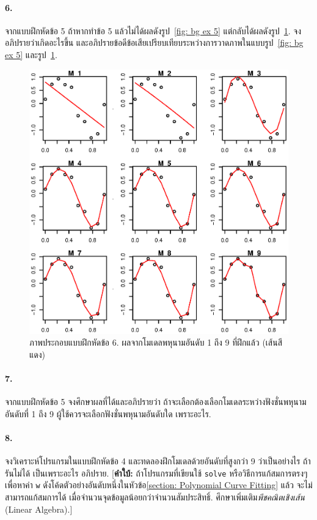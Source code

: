 \paragraph{6.} จากแบบฝึกหัดข้อ 5 
ถ้าหากทำข้อ 5 แล้วไม่ได้ผลดังรูป~\ref{fig: bg ex 5} 
แต่กลับได้ผลดังรูป~\ref{fig: bg ex 6}. 
จงอภิปรายว่าเกิดอะไรขึ้น และอภิปรายข้อดีข้อเสียเปรียบเทียบระหว่างการวาดภาพในแบบรูป~\ref{fig: bg ex 5} และรูป~\ref{fig: bg ex 6}.

%
\begin{figure}
\begin{center}
\includegraphics[width=5.5in]{02Background/bgEx06.eps}
\end{center}
\caption{ภาพประกอบแบบฝึกหัดข้อ 6.
ผลจากโมเดลพหุนามอันดับ 1 ถึง 9 ที่ฝึกแล้ว (เส้นสีแดง)}
\label{fig: bg ex 6}
\end{figure}
%

\paragraph{7.} จากแบบฝึกหัดข้อ 5
จงศึกษาผลที่ได้และอภิปรายว่า
ถ้าจะเลือกต้องเลือกโมเดลระหว่างฟังชั่นพหุนามอันดับที่ 1 ถึง 9 
ผู้ใช้ควรจะเลือกฟังชั่นพหุนามอันดับใด เพราะอะไร.

\paragraph{8.} จงวิเคราะห์โปรแกรมในแบบฝึกหัดข้อ 4 และทดลองฝึกโมเดลด้วยอันดับที่สูงกว่า 9 ว่าเป็นอย่างไร ถ้ารันไม่ได้ เป็นเพราะอะไร อภิปราย.
[\textbf{คำใบ้:} ถ้าโปรแกรมที่เขียนใช้ \texttt{solve} หรือวิธีการแก้สมการตรงๆ เพื่อหาค่า \texttt{w} ดังโค้ดตัวอย่างอันดับหนึ่งในหัวข้อ\ref{section: Polynomial Curve Fitting} แล้ว จะไม่สามารถแก้สมการได้ เมื่อจำนวนจุดข้อมูลน้อยกว่าจำนวนสัมประสิทธิ์. 
ศึกษาเพิ่มเติม\textit{พีชคณิตเชิงเส้น} (Linear Algebra).]

